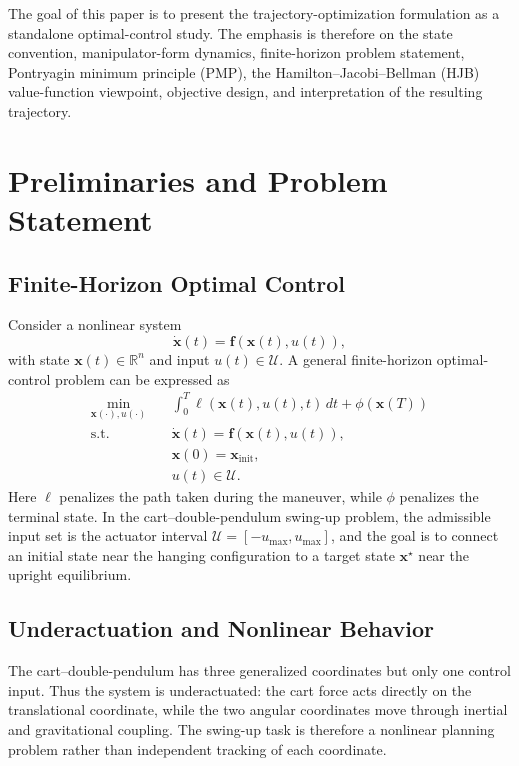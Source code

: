 \documentclass[conference]{IEEEtran}
\begin{document}
The goal of this paper is to present the trajectory-optimization formulation as a standalone optimal-control study. The emphasis is therefore on the state convention, manipulator-form dynamics, finite-horizon problem statement, Pontryagin minimum principle (PMP), the Hamilton--Jacobi--Bellman (HJB) value-function viewpoint, objective design, and interpretation of the resulting trajectory.

\section{Preliminaries and Problem Statement}
\subsection{Finite-Horizon Optimal Control}
Consider a nonlinear system
\begin{equation}
\dot{\bm{x}}(t)=\bm{f}(\bm{x}(t),u(t)),
\end{equation}
with state $\bm{x}(t)\in\mathbb{R}^n$ and input $u(t)\in\mathcal{U}$. A general finite-horizon optimal-control problem can be expressed as
\begin{align}
\min_{\bm{x}(\cdot),u(\cdot)} \quad &
\int_0^T \ell(\bm{x}(t),u(t),t)\,dt + \phi(\bm{x}(T)) \\
\text{s.t.} \quad &
\dot{\bm{x}}(t)=\bm{f}(\bm{x}(t),u(t)), \\
& \bm{x}(0)=\bm{x}_{\mathrm{init}}, \\
& u(t)\in\mathcal{U}.
\label{eq:continuousocp}
\end{align}
Here $\ell$ penalizes the path taken during the maneuver, while $\phi$ penalizes the terminal state. In the cart--double-pendulum swing-up problem, the admissible input set is the actuator interval $\mathcal{U}=[-u_{\max},u_{\max}]$, and the goal is to connect an initial state near the hanging configuration to a target state $\bm{x}^\star$ near the upright equilibrium.

\subsection{Underactuation and Nonlinear Behavior}
The cart--double-pendulum has three generalized coordinates but only one control input. Thus the system is underactuated: the cart force acts directly on the translational coordinate, while the two angular coordinates move through inertial and gravitational coupling. The swing-up task is therefore a nonlinear planning problem rather than independent tracking of each coordinate.
\end{document}
